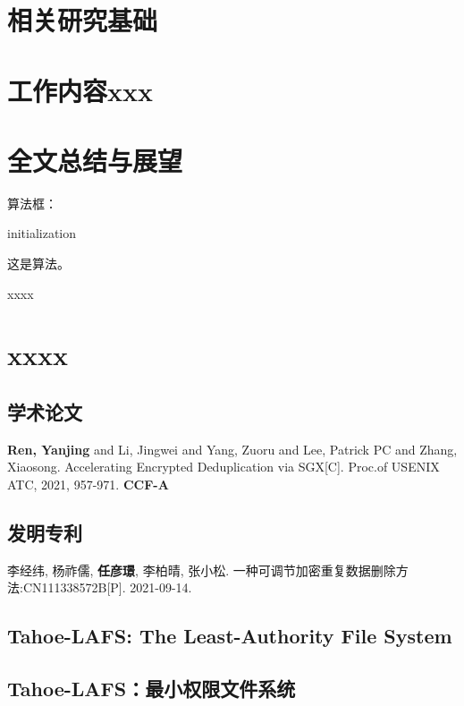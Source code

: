 \documentclass[master]{thesis-uestc}
\begin{document}
\chapter{相关研究基础}
\chapter{工作内容xxx}
\chapter{全文总结与展望}

算法框：

\begin{algorithm}[H]\label{alg:1}
    initialization\;
    \caption{How to wirte an algorithm.}
\end{algorithm}

这是算法。

\thesisacknowledgement

xxxx %


\thesisappendix
\chapter{xxxx} %

\begin{thesistheaccomplish}
    \section{学术论文}
     \textbf{Ren, Yanjing} and Li, Jingwei and Yang, Zuoru and Lee, Patrick PC and Zhang, Xiaosong. Accelerating Encrypted Deduplication via SGX[C]. Proc.of USENIX ATC, 2021, 957-971. \textbf{CCF-A}
    \section{发明专利}
     李经纬, 杨祚儒, \textbf{任彦璟}, 李柏晴, 张小松. 一种可调节加密重复数据删除方法:CN111338572B[P]. 2021-09-14.
\end{thesistheaccomplish}

\thesistranslationoriginal
\section{Tahoe-LAFS: The Least-Authority File System}

\thesistranslationchinese
\section{Tahoe-LAFS：最小权限文件系统}
\end{document}
